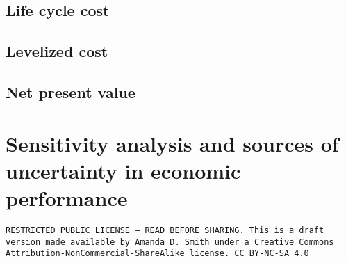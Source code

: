 \documentclass[10pt]{article}
\begin{document}
\subsection{Life cycle cost}

\subsection{Levelized cost}

\subsection{Net present value}

\section{Sensitivity analysis and sources of uncertainty in economic performance}

\bigskip

\noindent
\texttt{\footnotesize RESTRICTED PUBLIC LICENSE --- READ BEFORE SHARING. This is a draft version made available by Amanda D. Smith under a Creative Commons Attribution-NonCommercial-ShareAlike license. 
\href{https://creativecommons.org/licenses/by-nc-sa/4.0/}{CC BY-NC-SA 4.0}}

\newpage
\printbibliography
\end{document}
